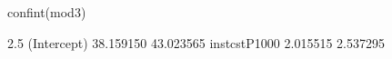 \begin{Schunk}
\begin{Sinput}
 confint(mod3)
\end{Sinput}
\begin{Soutput}
                 2.5 %    97.5 %
(Intercept)  38.159150 43.023565
instcstP1000  2.015515  2.537295
\end{Soutput}
\end{Schunk}

